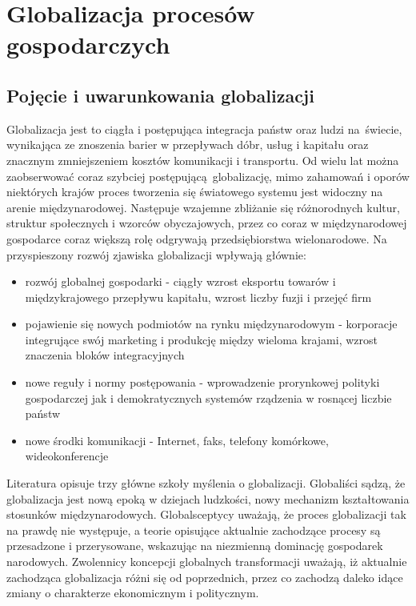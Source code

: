 \documentclass[12pt]{extarticle}
\begin{document}
\section{Globalizacja procesów gospodarczych}

\subsection{Pojęcie i uwarunkowania globalizacji}

Globalizacja jest to ciągła i postępująca integracja państw oraz ludzi na świecie, wynikająca ze znoszenia barier w przepływach dóbr, usług i kapitału oraz znacznym zmniejszeniem kosztów komunikacji i transportu. Od wielu lat można zaobserwować coraz szybciej postępującą globalizację, mimo zahamowań i oporów niektórych krajów proces tworzenia się światowego systemu jest widoczny na arenie międzynarodowej. Następuje wzajemne zbliżanie się różnorodnych kultur, struktur społecznych i wzorców obyczajowych, przez co coraz w międzynarodowej gospodarce coraz większą rolę odgrywają przedsiębiorstwa wielonarodowe. Na przyspieszony rozwój zjawiska globalizacji wpływają głównie:

\begin{itemize}
	\item rozwój globalnej gospodarki - ciągły wzrost eksportu towarów i międzykrajowego przepływu kapitału, wzrost liczby fuzji i przejęć firm
	\item pojawienie się nowych podmiotów na rynku międzynarodowym - korporacje integrujące swój marketing i produkcję między wieloma krajami, wzrost znaczenia bloków integracyjnych
	\item nowe reguły i normy postępowania - wprowadzenie prorynkowej polityki gospodarczej jak i demokratycznych systemów rządzenia w rosnącej liczbie państw 
	\item nowe środki komunikacji - Internet, faks, telefony komórkowe, wideokonferencje
\end{itemize}

Literatura opisuje trzy główne szkoły myślenia o globalizacji. Globaliści sądzą, że globalizacja jest nową epoką w dziejach ludzkości, nowy mechanizm kształtowania stosunków międzynarodowych. Globalsceptycy uważają, że proces globalizacji tak na prawdę nie występuje, a teorie opisujące aktualnie zachodzące procesy są przesadzone i przerysowane, wskazując na niezmienną dominację gospodarek narodowych. Zwolennicy koncepcji globalnych transformacji uważają, iż aktualnie zachodząca globalizacja różni się od poprzednich, przez co zachodzą daleko idące zmiany o charakterze ekonomicznym i politycznym.
\end{document}
